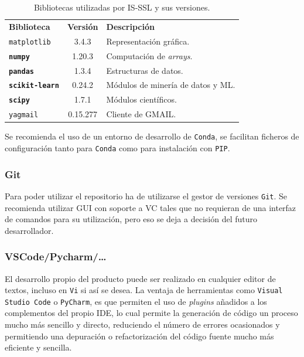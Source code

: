 \begin{table}[]
\centering
\begin{tabular}{lcl}
	\toprule
	\textbf{Biblioteca} & \textbf{Versión} & \textbf{Descripción}\\ \rowcolor[HTML]{EFEFEF} 
	\midrule
	\rowcolor[HTML]{EFEFEF} 
	\texttt{matplotlib}    & 3.4.3   & Representación gráfica.   \\  
	\textbf{\texttt{numpy}}    & 1.20.3 &  Computación de \textit{arrays}.  \\ \rowcolor[HTML]{EFEFEF} 
	\textbf{\texttt{pandas}}    & 1.3.4  & Estructuras de datos.    \\  
	\textbf{\texttt{scikit-learn}}    & 0.24.2 & Módulos de minería de datos y ML.   \\ \rowcolor[HTML]{EFEFEF} 
	\textbf{\texttt{scipy}}    & 1.7.1  & Módulos científicos.    \\ 
	\texttt{yagmail}    & 0.15.277  & Cliente de GMAIL.    \\ 
	\bottomrule
\end{tabular}
\caption{Bibliotecas utilizadas por IS-SSL y sus versiones.}\label{tab:bibliotecas-python-is-ssl}
\end{table}

Se recomienda el uso de un entorno de desarrollo de \texttt{Conda}, se facilitan ficheros de configuración tanto para \texttt{Conda} como para instalación con \texttt{PIP}.

\subsubsection{Git}
Para poder utilizar el repositorio ha de utilizarse el gestor de versiones \texttt{Git}. Se recomienda utilizar GUI con soporte a VC tales que no requieran de una interfaz de comandos para su utilización, pero eso se deja a decisión del futuro desarrollador.

\subsubsection{VSCode/Pycharm/\dots}
El desarrollo propio del producto puede ser realizado en cualquier editor de textos, incluso en \texttt{Vi} si así se desea. La ventaja de herramientas como \texttt{Visual Studio Code} o \texttt{PyCharm}, es que permiten el uso de \textit{plugins} añadidos a los complementos del propio IDE, lo cual permite la generación de código un proceso mucho más sencillo y directo, reduciendo el número de errores ocasionados y permitiendo una depuración o refactorización del código fuente mucho más eficiente y sencilla.

